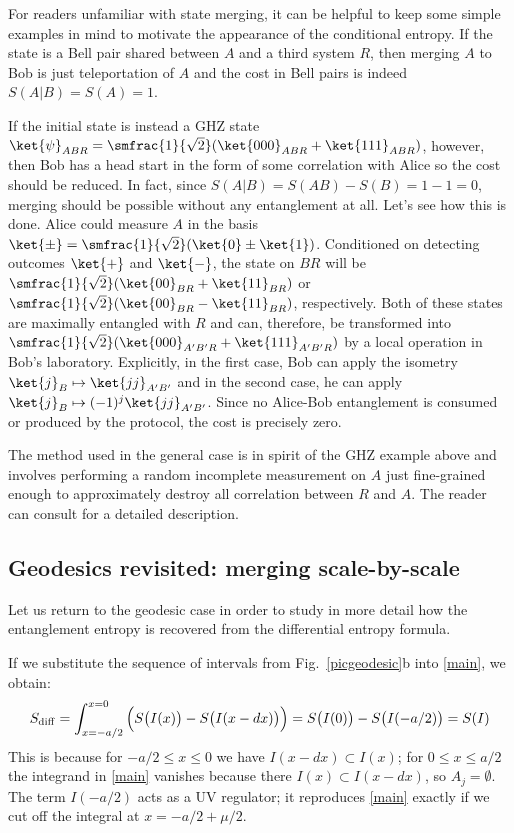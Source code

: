 \documentclass[12pt]{article}
\def\sdiff{S_{\rm diff}}
\newcommand{\figref}[1]{Fig.~\ref{#1}}
\begin{document}
For readers unfamiliar with state merging, it can be helpful to keep some simple examples in mind to motivate the appearance of the conditional entropy. If the state is a Bell pair shared between $A$ and a third system $R$, then merging $A$ to Bob is just teleportation of $A$ and the cost in Bell pairs is indeed $S(A|B) = S(A) = 1$.

If the initial state is instead a GHZ state $\ket{\psi}_{ABR} = \smfrac{1}{\sqrt{2}} ( \ket{000}_{ABR} + \ket{111}_{ABR})$, however, then Bob has a head start in the form of some correlation with Alice so the cost should be reduced. In fact, since $S(A|B) = S(AB) - S(B) = 1 -1 = 0$, merging should be possible without any entanglement at all.
%
Let's see how this is done. Alice could measure $A$ in the basis $\ket{\pm} = \smfrac{1}{\sqrt{2}} ( \ket{0} \pm \ket{1} )$. Conditioned on detecting outcomes $\ket{+}$ and $\ket{-}$, the state on $BR$ will be $\smfrac{1}{\sqrt{2}} ( \ket{00}_{BR} + \ket{11}_{BR} )$ or $\smfrac{1}{\sqrt{2}} ( \ket{00}_{BR} - \ket{11}_{BR} )$, respectively. Both of these states are maximally entangled with $R$ and can, therefore, be transformed into $\smfrac{1}{\sqrt{2}} ( \ket{000}_{A'B'R} + \ket{111}_{A'B'R} )$ by a local operation in Bob's laboratory. Explicitly, in the first case, Bob can apply the isometry $\ket{j}_B \mapsto \ket{jj}_{A'B'}$ and in the second case, he can apply $\ket{j}_B \mapsto (-1)^j \ket{jj}_{A'B'}$. Since no Alice-Bob entanglement is consumed or produced by the protocol, the cost is precisely zero.

The method used in the general case is in spirit of the GHZ example above and involves performing a random incomplete measurement on $A$ just fine-grained enough to approximately destroy all correlation between $R$ and $A$. The reader can consult \cite{horodecki2007quantum} for a detailed description.

\subsection{Geodesics revisited: merging scale-by-scale}
\label{scalebyscale}

Let us return to the geodesic case in order to study in more detail how the entanglement entropy is recovered from the differential entropy formula.

If we substitute the sequence of intervals from \figref{picgeodesic}b into \eqref{main}, we obtain:
\begin{equation}
\sdiff = \int_{x = -a/2}^{x=0} \Big( S\big(I(x)\big) - S\big(I(x-dx)\big)\Big)  = S\big(I(0)\big) - S\big(I(-a/2)\big) = S(I)
\label{geodlength}
\end{equation}
This is because for  $-a/2 \leq x \leq 0$ we have $I(x-dx) \subset I(x)$; for $0 \leq x \leq a/2$ the integrand in \eqref{main} vanishes because there $I(x) \subset I(x-dx)$, so $A_j = \emptyset$. The term $I(-a/2)$ acts as a UV regulator; it reproduces \eqref{main} exactly if we cut off the integral at $x = -a/2 + \mu/2$.
\end{document}
